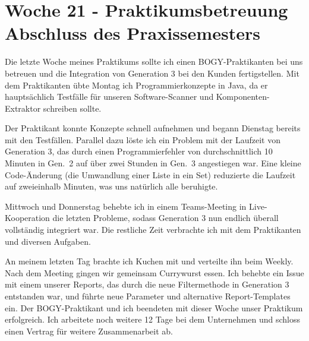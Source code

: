 \section{Woche 21 - Praktikumsbetreuung \headerand Abschluss des Praxissemesters} \label{sec:bericht-wo-21}


\lweekdaymarginpar{\weekdayMondayLong}

Die letzte Woche meines Praktikums sollte ich einen BOGY-Praktikanten bei uns betreuen und die Integration von Generation 3 bei den Kunden fertigstellen.
Mit dem Praktikanten übte Montag ich Programmierkonzepte in Java, da er hauptsächlich Testfälle für unseren Software-Scanner und Komponenten-Extraktor schreiben sollte.

\sweekdaymarginpar{\weekdayTuesdayLong}

Der Praktikant konnte Konzepte schnell aufnehmen und begann Dienstag bereits mit den Testfällen.
Parallel dazu löste ich ein Problem mit der Laufzeit von Generation 3, das durch einen Programmierfehler von durchschnittlich 10 Minuten in Gen.\ 2 auf über zwei Stunden in Gen.\ 3 angestiegen war.
Eine kleine Code-Änderung (die Umwandlung einer Liste in ein Set) reduzierte die Laufzeit auf zweieinhalb Minuten, was uns natürlich alle beruhigte.

\sweekdaymarginpar{\weekdayWednesdayShort, \weekdayThursdayShort}

Mittwoch und Donnerstag behebte ich in einem Teams-Meeting in Live-Kooperation die letzten Probleme, sodass Generation 3 nun endlich überall vollständig integriert war.
Die restliche Zeit verbrachte ich mit dem Praktikanten und diversen Aufgaben.

\sweekdaymarginpar{\weekdayFridayLong}

An meinem letzten Tag brachte ich Kuchen mit und verteilte ihn beim Weekly.
Nach dem Meeting gingen wir gemeinsam Currywurst essen.
Ich behebte ein Issue mit einem unserer Reports, das durch die neue Filtermethode in Generation 3 entstanden war, und führte neue Parameter und alternative Report-Templates ein.
Der BOGY-Praktikant und ich beendeten mit dieser Woche unser Praktikum erfolgreich.
Ich arbeitete noch weitere 12 Tage bei dem Unternehmen und schloss einen Vertrag für weitere Zusammenarbeit ab.
